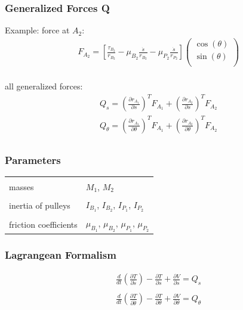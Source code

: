 \begin{frame}
	\frametitle{Generalized Forces Q}
	
	Example: force at $A_2$:
	\begin{align*}
	  &F_{A_2} = \left[ \frac{\tau_{B_2}}{r_{B_2}} - \mu_{B_2} 
	  \frac{\dot{s}}{r_{B_2}} - \mu_{P_2} \frac{\dot{s}}{r_{P_2}} \right]
	  \left(
	  \begin{matrix}
	    \cos(\theta) \\
	    \sin(\theta) \\
	  \end{matrix}
	  \right) \\
	\end{align*}
	
	all generalized forces:
	\begin{align*}
	  &Q_s = \left( \frac{\partial r_{A_1}}{\partial s} \right)^T F_{A_1} 
	  + \left( \frac{\partial r_{A_2}}{\partial s} \right)^T F_{A_2} \\
	  &Q_{\theta} = \left( \frac{\partial r_{A_1}}{\partial \theta} 
	  \right)^T F_{A_1} + \left( \frac{\partial r_{A_2}}{\partial \theta} 
	  \right)^T F_{A_2} \\
	\end{align*}
\end{frame}

\begin{frame}
	\frametitle{Parameters}
	
	\begin{tabular}{ll}
	  & \\
	  masses & $M_1$, $M_2$ \\
	  &\\
	  inertia of pulleys & $I_{B_1}$, $I_{B_2}$, $I_{P_1}$, $I_{P_2}$ \\
	  &\\
	  friction coefficients & $\mu_{B_1}$, $\mu_{B_2}$, $\mu_{P_1}$, 
	  $\mu_{P_2}$  \\
	\end{tabular}
\end{frame}

\begin{frame}
	\frametitle{Lagrangean Formalism}
	
	\begin{align*}
	  &\frac{d}{dt}\left(\frac{\partial T}{\partial \dot{s}}\right) -
	  \frac{\partial T}{\partial s} +
	  \frac{\partial V}{\partial s}
	  = Q_s \\
	  &{}\\
	  &\frac{d}{dt}\left(\frac{\partial T}{\partial \dot{\theta}}\right) -
	  \frac{\partial T}{\partial \theta} +
	  \frac{\partial V}{\partial \theta}
	  = Q_{\theta} \\
	\end{align*}
\end{frame}


